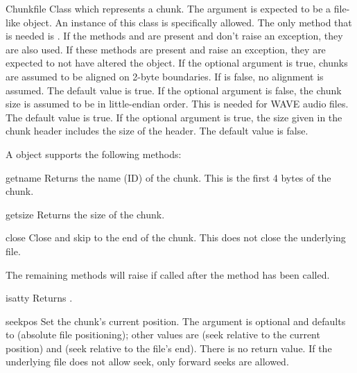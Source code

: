 \begin{classdesc}{Chunk}{file}
Class which represents a chunk.  The  argument is expected
to be a file-like object.  An instance of this class is specifically
allowed.  The only method that is needed is .  If the
methods  and  are present and don't
raise an exception, they are also used.  If these methods are present
and raise an exception, they are expected to not have altered the
object.  If the optional argument  is true, chunks are
assumed to be aligned on 2-byte boundaries.  If  is
false, no alignment is assumed.  The default value is true.  If the
optional argument  is false, the chunk size is assumed
to be in little-endian order.  This is needed for WAVE audio files.
The default value is true.  If the optional argument 
is true, the size given in the chunk header includes the size of the
header.  The default value is false.
\end{classdesc}

A  object supports the following methods:

\begin{methoddesc}{getname}{}
Returns the name (ID) of the chunk.  This is the first 4 bytes of the
chunk.
\end{methoddesc}

\begin{methoddesc}{getsize}{}
Returns the size of the chunk.
\end{methoddesc}

\begin{methoddesc}{close}{}
Close and skip to the end of the chunk.  This does not close the
underlying file.
\end{methoddesc}

The remaining methods will raise  if called after
the  method has been called.

\begin{methoddesc}{isatty}{}
Returns .
\end{methoddesc}

\begin{methoddesc}{seek}{pos}
Set the chunk's current position.  The  argument is
optional and defaults to  (absolute file positioning); other
values are  (seek relative to the current position) and
 (seek relative to the file's end).  There is no return value.
If the underlying file does not allow seek, only forward seeks are
allowed.
\end{methoddesc}

